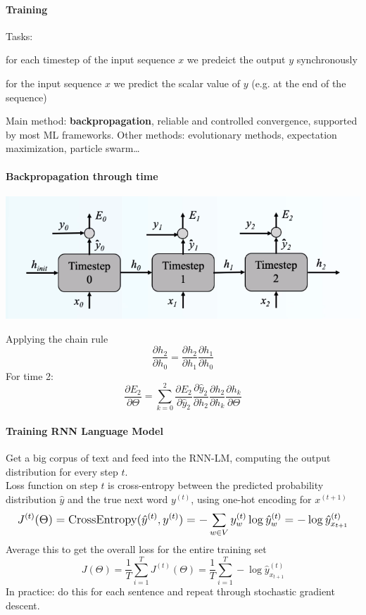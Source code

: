 \documentclass[10pt]{report}
\begin{document}
\paragraph{Training} Tasks:
\begin{list}{}{}
	\item for each timestep of the input sequence $x$ we predeict the output $y$ synchronously
	\item for the input sequence $x$ we predict the scalar value of $y$ (e.g. at the end of the sequence)
\end{list}
Main method: \textbf{backpropagation}, reliable and controlled convergence, supported by most ML frameworks. Other methods: evolutionary methods, expectation maximization, particle swarm\ldots\\
\paragraph{Backpropagation through time}
\begin{center}
	\includegraphics[scale=0.5]{27.png}
\end{center}
Applying the chain rule $$\frac{\partial h_2}{\partial h_0} = \frac{\partial h_2}{\partial h_1}\frac{\partial h_1}{\partial h_0}$$
For time 2:
$$\frac{\partial E_2}{\partial \Theta} = \sum_{k=0}^2\frac{\partial E_2}{\partial \hat{y}_2}\frac{\partial\hat{y}_2}{\partial h_2}\frac{\partial h_2}{\partial h_k}\frac{\partial h_k}{\partial\Theta}$$
\paragraph{Training RNN Language Model} Get a big corpus of text and feed into the RNN-LM, computing the output distribution for every step $t$.\\
Loss function on step $t$ is cross-entropy between the predicted probability distribution $\hat{y}$ and the true next word $y^{(t)}$, using one-hot encoding for $x^{(t+1)}$
$$\mathlarger{J^{(t)}(\Theta) = \hbox{CrossEntropy}(\hat{y}^{(t)}, y^{(t)}) = -\sum_{w\in V} y_w^{(t)}\log\hat{y}_w^{(t)} = -\log\hat{y}_{x_{t+1}}^{(t)}}$$
Average this to get the overall loss for the entire training set
$$J(\Theta) = \frac{1}{T}\sum_{i=1}^T J^{(t)}(\Theta) = \frac{1}{T}\sum_{i=1}^T -\log\hat{y}_{x_{t+1}}^{(t)}$$
In practice: do this for each sentence and repeat through stochastic gradient descent.
\end{document}
